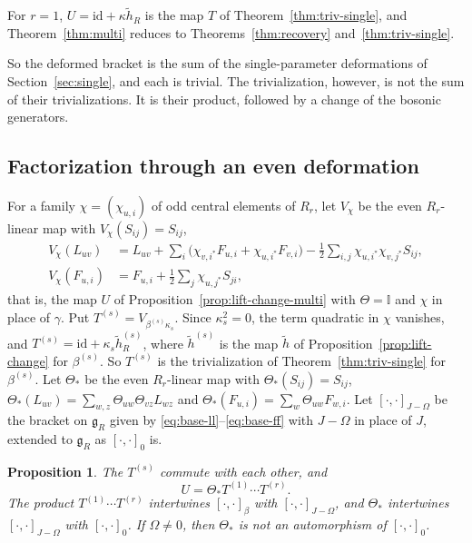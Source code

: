 \documentclass[11pt]{article}
\numberwithin{equation}{section}
\newtheorem{proposition}[theorem]{Proposition}
\theoremstyle{definition}
\theoremstyle{remark}
\begin{document}
For $r=1$, $U=\mathrm{id}+\kappa\tilde h_R$ is the map $T$ of Theorem~\ref{thm:triv-single}, and
Theorem~\ref{thm:multi} reduces to Theorems~\ref{thm:recovery} and~\ref{thm:triv-single}.

So the deformed bracket is the sum of the single-parameter deformations of
Section~\ref{sec:single}, and each is trivial. The trivialization, however, is not
the sum of their trivializations. It is their product, followed by a change of the bosonic generators.

\subsection{Factorization through an even deformation}\label{sec:factor}

For a family $\chi=(\chi_{u,i})$ of odd central elements of $R_r$, let $V_\chi$ be the even
$R_r$-linear map with $V_\chi(S_{ij})=S_{ij}$,
\begin{align*}
 V_\chi(L_{uv})&=L_{uv}+\sum_i\bigl(\chi_{v,i^*}F_{u,i}+\chi_{u,i^*}F_{v,i}\bigr)
  -\tfrac12\sum_{i,j}\chi_{u,i^*}\chi_{v,j^*}S_{ij},\\
 V_\chi(F_{u,i})&=F_{u,i}+\tfrac12\sum_j\chi_{u,j^*}S_{ji},
\end{align*}
that is, the map $U$ of Proposition~\ref{prop:lift-change-multi} with $\Theta=\mathbb I$ and $\chi$ in
place of $\gamma$. Put $T^{(s)}=V_{\beta^{(s)}\kappa_s}$. Since $\kappa_s^2=0$, the term quadratic in $\chi$ vanishes, and
$T^{(s)}=\mathrm{id}+\kappa_s\tilde h^{(s)}_R$, where $\tilde h^{(s)}$ is the map $\tilde h$ of Proposition~\ref{prop:lift-change} for $\beta^{(s)}$. So $T^{(s)}$ is the trivialization of Theorem~\ref{thm:triv-single} for $\beta^{(s)}$.
Let $\Theta_*$ be the even $R_r$-linear map with $\Theta_*(S_{ij})=S_{ij}$,
$\Theta_*(L_{uv})=\sum_{w,z}\Theta_{uw}\Theta_{vz}L_{wz}$ and $\Theta_*(F_{u,i})=\sum_w\Theta_{uw}F_{w,i}$.
Let $[\cdot,\cdot]_{J-\Omega}$ be the bracket on $\mathfrak g_R$ given by
\eqref{eq:base-ll}--\eqref{eq:base-ff} with $J-\Omega$ in place of $J$, extended to
$\mathfrak g_R$ as $[\cdot,\cdot]_0$ is.

\begin{proposition}\label{prop:factor}
The $T^{(s)}$ commute with each other, and
\[
 U=\Theta_*T^{(1)}\cdots T^{(r)}.
\]
The product $T^{(1)}\cdots T^{(r)}$ intertwines $[\cdot,\cdot]_\beta$ with $[\cdot,\cdot]_{J-\Omega}$, and
$\Theta_*$ intertwines $[\cdot,\cdot]_{J-\Omega}$ with $[\cdot,\cdot]_0$. If $\Omega\neq0$, then $\Theta_*$ is not an
automorphism of $[\cdot,\cdot]_0$.
\end{proposition}
\end{document}
